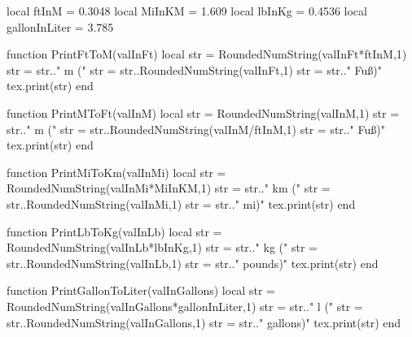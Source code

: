 \begin{luacode}
	local ftInM = 0.3048
	local MiInKM = 1.609
	local lbInKg = 0.4536
	local gallonInLiter = 3.785
	
	function PrintFtToM(valInFt)
		local str = RoundedNumString(valInFt*ftInM,1)
		str = str.." m ("
		str = str..RoundedNumString(valInFt,1)
		str = str.." Fuß)"
		tex.print(str)
	end
	
	function PrintMToFt(valInM)
		local str = RoundedNumString(valInM,1)
		str = str.." m ("
		str = str..RoundedNumString(valInM/ftInM,1)
		str = str.." Fuß)"
		tex.print(str)
	end

	function PrintMiToKm(valInMi)
		local str = RoundedNumString(valInMi*MiInKM,1)
		str = str.." km ("
		str = str..RoundedNumString(valInMi,1)
		str = str.." mi)"
		tex.print(str)
	end

	function PrintLbToKg(valInLb)
		local str = RoundedNumString(valInLb*lbInKg,1)
		str = str.." kg ("
		str = str..RoundedNumString(valInLb,1)
		str = str.." pounds)"
		tex.print(str)
	end

	function PrintGallonToLiter(valInGallons)
		local str = RoundedNumString(valInGallons*gallonInLiter,1)
		str = str.." l ("
		str = str..RoundedNumString(valInGallons,1)
		str = str.." gallons)"
		tex.print(str)
	end
\end{luacode}

\newcommand{\ft}[1]{
	\directlua{PrintFtToM(#1)}
}

\newcommand{\metre}[1]{
	\directlua{PrintMToFt(#1)}
}

\newcommand{\mile}[1]{
	\directlua{PrintMiToKm(#1)}
}

\newcommand{\lb}[1]{
	\directlua{PrintLbToKg(#1)}
}

\newcommand{\gallon}[1]{
	\directlua{PrintGallonToLiter(#1)}
}
